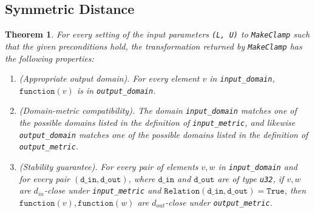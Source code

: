 \documentclass[11pt,a4paper]{article}
\newtheorem{theorem}{Theorem}
\theoremstyle{definition}
\newcommand{\din}{\texttt{d\_in}}
\newcommand{\dout}{\texttt{d\_out}}
\newcommand{\Relation}{\texttt{Relation}}
\newcommand{\True}{\texttt{True}}
\newcommand{\function}{\texttt{function}}
\newcommand{\silvia}[1]{{ {\color{blue}{(silvia)~#1}}}}
\newcommand{\todo}{{\textcolor{red}{TODO }}}
\begin{document}
\subsection{Symmetric Distance}



\begin{theorem}
    For every setting of the input parameters \texttt{(L, U)} to \texttt{MakeClamp} such that the given preconditions
    hold, the transformation returned by \texttt{MakeClamp} has the following properties:
    \begin{enumerate}
        \item \textup{(Appropriate output domain).} For every element $v$ in \texttt{input\_domain}, $\function(v)$ is in \texttt{output\_domain}. %
        
        \item \textup{(Domain-metric compatibility).} The domain \texttt{input\_domain} matches one of the possible domains listed in the definition of \texttt{input\_metric}, and likewise \texttt{output\_domain} matches one of the possible domains listed in the definition of \texttt{output\_metric}.
        
        \item \textup{(Stability guarantee).} For every pair of elements $v, w$ in \texttt{input\_domain} and for every pair $(\din, \dout)$, where $\din$ and $\dout$ are of type \texttt{u32}, if $v,w$ are $d_{in}$-close under \texttt{input\_metric} and $\Relation(\din, \dout) = \True$, then $\function(v), \function(w)$ are $d_{out}$-close under \texttt{output\_metric}.
    \end{enumerate}
\end{theorem}
\end{document}
